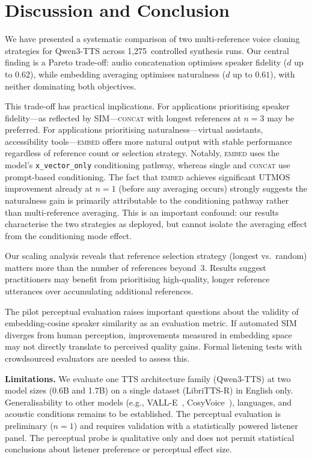 \documentclass{Interspeech}
\begin{document}
\section{Discussion and Conclusion}
\label{sec:conclusion}

We have presented a systematic comparison of two multi-reference voice cloning strategies for Qwen3-TTS across 1{,}275~controlled synthesis runs.
Our central finding is a Pareto trade-off: audio concatenation optimises speaker fidelity ($d$ up to $0.62$), while embedding averaging optimises naturalness ($d$ up to $0.61$), with neither dominating both objectives.

This trade-off has practical implications.
For applications prioritising speaker fidelity---as reflected by SIM---\textsc{concat} with longest references at $n{=}3$ may be preferred.
For applications prioritising naturalness---virtual assistants, accessibility tools---\textsc{embed} offers more natural output with stable performance regardless of reference count or selection strategy.
Notably, \textsc{embed} uses the model's \texttt{x\_vector\_only} conditioning pathway, whereas single and \textsc{concat} use prompt-based conditioning. The fact that \textsc{embed} achieves significant UTMOS improvement already at $n{=}1$ (before any averaging occurs) strongly suggests the naturalness gain is primarily attributable to the conditioning pathway rather than multi-reference averaging. This is an important confound: our results characterise the two strategies as deployed, but cannot isolate the averaging effect from the conditioning mode effect.

Our scaling analysis reveals that reference selection strategy (longest vs.\ random) matters more than the number of references beyond~3.
Results suggest practitioners may benefit from prioritising high-quality, longer reference utterances over accumulating additional references.

The pilot perceptual evaluation raises important questions about the validity of embedding-cosine speaker similarity as an evaluation metric.
If automated SIM diverges from human perception, improvements measured in embedding space may not directly translate to perceived quality gains.
Formal listening tests with crowdsourced evaluators are needed to assess this.

\textbf{Limitations.}
We evaluate one TTS architecture family (Qwen3-TTS) at two model sizes (0.6B and 1.7B) on a single dataset (LibriTTS-R) in English only.
Generalisability to other models (e.g., VALL-E~\cite{valle}, CosyVoice~\cite{cosyvoice}), languages, and acoustic conditions remains to be established.
The perceptual evaluation is preliminary ($n{=}1$) and requires validation with a statistically powered listener panel.
The perceptual probe is qualitative only and does not permit statistical conclusions about listener preference or perceptual effect size.
\end{document}
